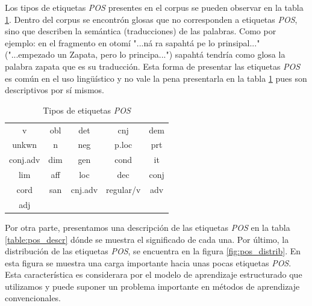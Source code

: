 \documentclass[letterpaper,12pt,oneside]{book}
\theoremstyle{definition}
\begin{document}
Los tipos de etiquetas \textit{POS} presentes en el corpus se pueden observar en la tabla \ref{table:pos_types}. Dentro del corpus se encontrón glosas que no corresponden a etiquetas \textit{POS}, sino que describen la semántica (traducciones) de las palabras. Como por ejemplo: en el fragmento en otomí \textsf{"...ná ra sapahtá pe lo prinsipal..."} ("...empezado un Zapata, pero lo principa...") \textsf{sapahtá} tendría como glosa la palabra \textsf{zapata} que es su traducción. Esta forma de presentar las etiquetas \textit{POS} es común en el uso lingüístico y no vale la pena presentarla en la tabla \ref{table:pos_types} pues son descriptivos por sí mismos. 

\begin{table}
	\centering
	\begin{tabular}{| c | c | c | c | c |}
		\hline
		v & obl & det & cnj & dem \\ 
		unkwn & n & neg & p.loc & prt \\
		conj.adv & dim & gen & cond & it \\
	    lim & aff & loc & dec & conj  \\
	    cord & san & cnj.adv & regular/v & adv \\
	    adj & & & & \\
	    \hline
	\end{tabular}
	\caption{Tipos de etiquetas \textit{POS}} 
	\label{table:pos_types}
\end{table}

Por otra parte, presentamos una descripción de las etiquetas \textit{POS} en la tabla \ref{table:pos_descr} dónde se muestra el significado de cada una. Por último, la distribución de las etiquetas \textit{POS}, se encuentra en la figura \ref{fig:pos_distrib}. En esta figura se muestra una carga importante hacia unas pocas etiquetas \textit{POS}. Esta característica es considerara por el modelo de aprendizaje estructurado que utilizamos y puede suponer un problema importante en métodos de aprendizaje convencionales.
\end{document}
